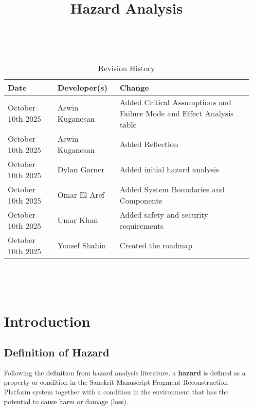 \documentclass{article}
\title{Hazard Analysis\\\progname}
\author{\authname}
\date{}
\begin{document}
\maketitle
\thispagestyle{empty}

~\newpage


\begin{table}[hp]
\caption{Revision History} \label{TblRevisionHistory}
\begin{tabularx}{\textwidth}{llX}
\toprule
\textbf{Date} & \textbf{Developer(s)} & \textbf{Change}\\
\midrule
October 10th 2025 & Aswin Kuganesan & Added Critical Assumptions and Failure Mode and Effect Analysis table\\
October 10th 2025 & Aswin Kuganesan & Added Reflection\\
October 10th 2025 & Dylan Garner & Added initial hazard analysis\\
October 10th 2025 & Omar El Aref & Added System Boundaries and Components\\
October 10th 2025 & Umar Khan & Added safety and security requirements\\
October 10th 2025 & Yousef Shahin & Created the roadmap\\

\bottomrule
\end{tabularx}
\end{table}

~\newpage

\tableofcontents

~\newpage



\section{Introduction}

\subsection{Definition of Hazard}

Following the definition from hazard analysis literature, a \textbf{hazard} is defined as a property or condition in the Sanskrit Manuscript Fragment Reconstruction Platform system together with a condition in the environment that has the potential to cause harm or damage (loss).
\end{document}
